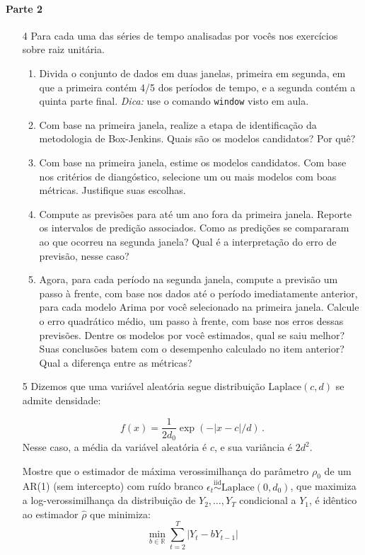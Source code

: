 \documentclass[10pt,a4paper]{article}
\begin{document}
	\paragraph{Parte 2}
	\begin{enumerate}
		
\item[4] Para cada uma das séries de tempo analisadas por vocês nos exercícios sobre raiz unitária.
\begin{enumerate}
	\item Divida o conjunto de dados em duas janelas, primeira em segunda, em que a primeira contém 4/5 dos períodos de tempo, e a segunda contém a quinta parte final. \textit{Dica:} use o comando \texttt{window} visto em aula.
	\item Com base na primeira janela, realize a etapa de identificação da metodologia de Box-Jenkins. Quais são os modelos candidatos? Por quê?
	\item Com base na primeira janela, estime os modelos candidatos. Com base nos critérios de diangóstico, selecione um ou mais modelos com boas métricas. Justifique suas escolhas.
	\item Compute as previsões para até um ano fora da primeira janela. Reporte os intervalos de predição associados. Como as predições se compararam ao que ocorreu na segunda janela? Qual é a interpretação do erro de previsão, nesse caso?
	\item Agora, para cada período na segunda janela, compute a previsão um passo à frente, com base nos dados até o período imediatamente anterior, para cada modelo Arima por você selecionado na primeira janela. Calcule o erro quadrático médio, um passo à frente, com base nos erros dessas previsões. Dentre os modelos por você estimados, qual se saiu melhor? Suas conclusões batem com o desempenho calculado no item anterior? Qual a diferença entre as métricas?
\end{enumerate}

		\item[5] Dizemos que uma variável aleatória segue distribuição $\text{Laplace}(c,d)$ se admite densidade:

	$$f(x) = \frac{1}{2d_0}\exp(-|x-c|/d) \, .$$
	Nesse caso, a média da variável aleatória é $c$, e sua variância é $2d^2$.

	 Mostre que o estimador de máxima verossimilhança do parâmetro $\rho_0$ de um AR(1) (sem intercepto) com ruído branco $\epsilon_t \overset{\text{iid}}{\sim}\text{Laplace}(0,d_0)$, que maximiza a log-verossimilhança da distribuição de $Y_2,\ldots, Y_T$ condicional a $Y_1$, é idêntico ao estimador $\hat \rho$ que minimiza:
	$$\min_{b \in \mathbb{R}}\sum_{t=2}^T |Y_t - b Y_{t-1}|$$
\end{enumerate}
\end{document}
